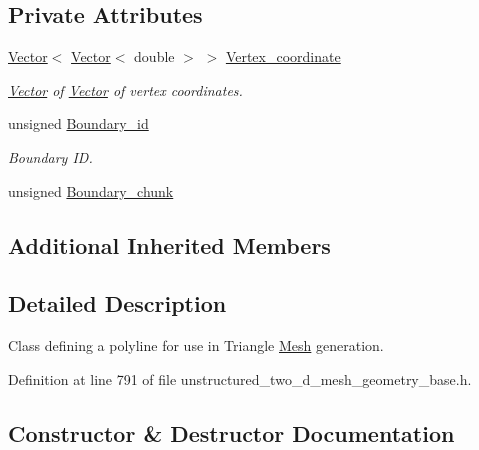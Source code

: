 \subsection*{Private Attributes}
\begin{DoxyCompactItemize}
\item 
\hyperlink{classoomph_1_1Vector}{Vector}$<$ \hyperlink{classoomph_1_1Vector}{Vector}$<$ double $>$ $>$ \hyperlink{classoomph_1_1TriangleMeshPolyLine_aa54beed8d41904a7e7429e0a59f127e7}{Vertex\+\_\+coordinate}
\begin{DoxyCompactList}\small\item\em \hyperlink{classoomph_1_1Vector}{Vector} of \hyperlink{classoomph_1_1Vector}{Vector} of vertex coordinates. \end{DoxyCompactList}\item 
unsigned \hyperlink{classoomph_1_1TriangleMeshPolyLine_a04b217e740ed45156f1f39cc4c15922e}{Boundary\+\_\+id}
\begin{DoxyCompactList}\small\item\em Boundary ID. \end{DoxyCompactList}\item 
unsigned \hyperlink{classoomph_1_1TriangleMeshPolyLine_a4ea4bb4d19d7cecf410772f99275ed98}{Boundary\+\_\+chunk}
\end{DoxyCompactItemize}
\subsection*{Additional Inherited Members}


\subsection{Detailed Description}
Class defining a polyline for use in Triangle \hyperlink{classoomph_1_1Mesh}{Mesh} generation. 

Definition at line 791 of file unstructured\+\_\+two\+\_\+d\+\_\+mesh\+\_\+geometry\+\_\+base.\+h.



\subsection{Constructor \& Destructor Documentation}
\mbox{\label{classoomph_1_1TriangleMeshPolyLine_a40bbbeea638b97a4ad714a1e3e0950a4}} 
